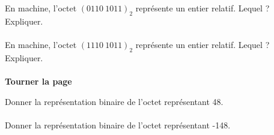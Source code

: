 \documentclass[a4paper,12pt,eval,firamath]{nsi}
\begin{document}
\maketitle

En machine, l'octet $(0110\ 1011)_2$ représente un entier relatif. Lequel ? Expliquer.\\

\\

En machine, l'octet $(1110\ 1011)_2$ représente un entier relatif. Lequel ? Expliquer.\\

\\

\hfill\textbf{Tourner la page}

\newpage

Donner la représentation binaire de l'octet représentant 48. \\

\\

Donner la représentation binaire de l'octet représentant -148. \\

\end{document}

